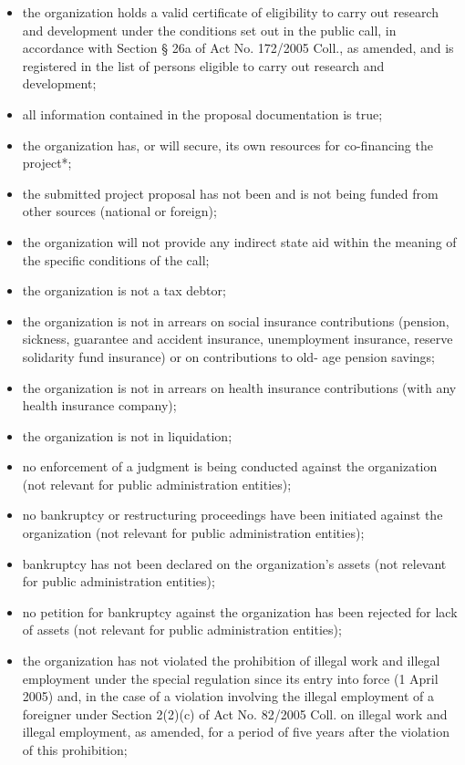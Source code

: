 \documentclass[10pt,a4paper]{article}
\begin{document}
\begin{itemize}
\item the organization holds a valid certificate of eligibility to carry out research and development under the conditions set out in the public call, in accordance with Section \S{} 26a of Act No. 172/2005 Coll., as amended, and is registered in the list of persons eligible to carry out research and development;
\item all information contained in the proposal documentation is true;
\item the organization has, or will secure, its own resources for co-financing the project*;
\item the submitted project proposal has not been and is not being funded from other sources (national or foreign);
\item the organization will not provide any indirect state aid within the meaning of the specific conditions of the call;
\item the organization is not a tax debtor;
\item the organization is not in arrears on social insurance contributions (pension, sickness, guarantee and accident insurance, unemployment insurance, reserve solidarity fund insurance) or on contributions to old- age pension savings;
\item the organization is not in arrears on health insurance contributions (with any health insurance company);
\item the organization is not in liquidation;
\item no enforcement of a judgment is being conducted against the organization (not relevant for public administration entities);
\item no bankruptcy or restructuring proceedings have been initiated against the organization (not relevant for public administration entities);
\item bankruptcy has not been declared on the organization's assets (not relevant for public administration entities);
\item no petition for bankruptcy against the organization has been rejected for lack of assets (not relevant for public administration entities);
\item the organization has not violated the prohibition of illegal work and illegal employment under the special regulation since its entry into force (1 April 2005) and, in the case of a violation involving the illegal employment of a foreigner under Section 2(2)(c) of Act No. 82/2005 Coll. on illegal work and illegal employment, as amended, for a period of five years after the violation of this prohibition;

\end{itemize}
\end{document}
